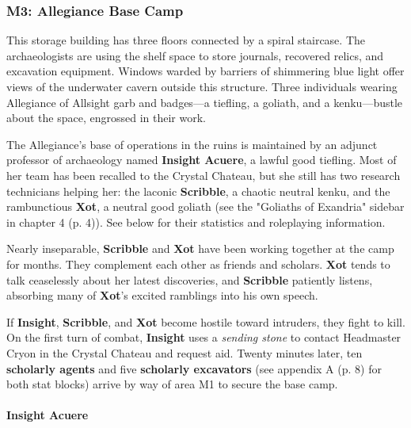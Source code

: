 \documentclass[letterpaper, 11pt, bg=full, twocolumn]{dndbook}
\begin{document}

\subsubsection{M3: Allegiance Base Camp}

\begin{DndReadAloud}
This storage building has three floors connected by a spiral staircase. The archaeologists are using the shelf space to store journals, recovered relics, and excavation equipment. Windows warded by barriers of shimmering blue light offer views of the underwater cavern outside this structure.
Three individuals wearing Allegiance of Allsight garb and badges---a tiefling, a goliath, and a kenku---bustle about the space, engrossed in their work.
\end{DndReadAloud}

The Allegiance's base of operations in the ruins is maintained by an adjunct professor of archaeology named \textbf{Insight Acuere}, a lawful good tiefling. Most of her team has been recalled to the Crystal Chateau, but she still has two research technicians helping her: the laconic \textbf{Scribble}, a chaotic neutral kenku, and the rambunctious \textbf{Xot}, a neutral good goliath (see the "Goliaths of Exandria" sidebar in chapter 4 (p. 4)). See below for their statistics and roleplaying information.

Nearly inseparable, \textbf{Scribble} and \textbf{Xot} have been working together at the camp for months. They complement each other as friends and scholars. \textbf{Xot} tends to talk ceaselessly about her latest discoveries, and \textbf{Scribble} patiently listens, absorbing many of \textbf{Xot}'s excited ramblings into his own speech.

If \textbf{Insight}, \textbf{Scribble}, and \textbf{Xot} become hostile toward intruders, they fight to kill. On the first turn of combat, \textbf{Insight} uses a \textit{sending stone} to contact Headmaster Cryon in the Crystal Chateau and request aid. Twenty minutes later, ten \textbf{scholarly agents} and five \textbf{scholarly excavators} (see appendix A (p. 8) for both stat blocks) arrive by way of area M1 to secure the base camp.


\paragraph{Insight Acuere}
\end{document}
